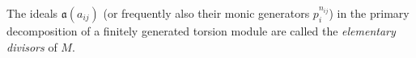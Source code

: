 The ideals $\mathfrak{a}(a_{ij})$ (or frequently also their monic generators $p_i^{n_{ij}}$) in the primary decomposition of a finitely generated torsion module are called the \emph{elementary divisors} of $M$.
